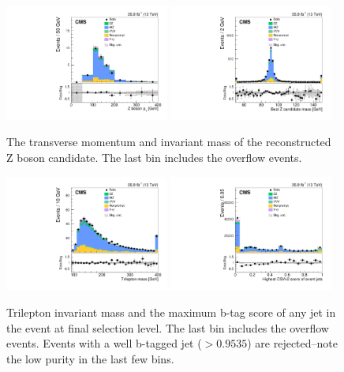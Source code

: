 \begin{figure}[!bh]
\centering
\includegraphics[width=0.48\textwidth]{figures/dibosons/wz3l/pTZ.pdf}
\includegraphics[width=0.48\textwidth]{figures/dibosons/wz3l/minMassZ_Nminus1.pdf}
\caption{The transverse momentum and invariant mass of the reconstructed Z boson candidate.
The last bin includes the overflow events.
\label{fig:wz3l_z}}
\end{figure}
\clearpage

\begin{figure}[!t]
\centering
\includegraphics[width=0.48\textwidth]{figures/dibosons/wz3l/m3l_Nminus1.pdf}
\includegraphics[width=0.48\textwidth]{figures/dibosons/wz3l/bDiscrMax_Nminus1.pdf}
\caption{Trilepton invariant mass and the maximum b-tag score of any jet in the event
at final selection level.
The last bin includes the overflow events.
Events with a well b-tagged jet ($>0.9535$) are rejected--note the low purity in the last few bins.
\label{fig:wz3l_purity}}
\end{figure}

